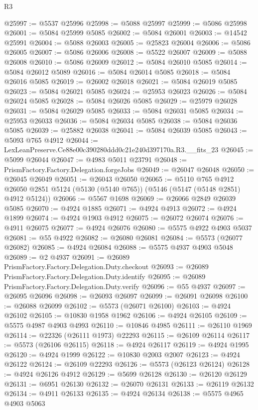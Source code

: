 \begin{lexlean}{R3}
\begin{coremodule}
@25997 := @5537 @25996
@25998 := @5088 @25997
@25999 := @5086 @25998
@26001 := @5084 @25999 @5085
@26002 := @5084 @26001
@26003 := @14542 @25991
@26004 := @5088 @26003
@26005 := @25823 @26004
@26006 := @5086 @26005
@26007 := @5086 @26006
@26008 := @5522 @26007
@26009 := @5088 @26008
@26010 := @5086 @26009
@26012 := @5084 @26010 @5085
@26014 := @5084 @26012 @5089
@26016 := @5084 @26014 @5085
@26018 := @5084 @26016 @5085
@26019 := @26002 @26018
@26021 := @5084 @26019 @5085
@26023 := @5084 @26021 @5085
@26024 := @25953 @26023
@26026 := @5084 @26024 @5085
@26028 := @5084 @26026 @5085
@26029 := @25979 @26028
@26031 := @5084 @26029 @5085
@26033 := @5084 @26031 @5085
@26034 := @25953 @26033
@26036 := @5084 @26034 @5085
@26038 := @5084 @26036 @5085
@26039 := @25882 @26038
@26041 := @5084 @26039 @5085
@26043 := @5093 @765 @4912
@26044 := LexLeanPreserve.Ce88e00c390280ddd0c21e240d397170a.R3.__fits_23
@26045 := @5099 @26044
@26047 := @4983 @5011 @23791
@26048 := PrismFactory.Factory.Delegation.forgeJobs
@26049 := @26047 @26048
@26050 := @26045 @26049
@26051 := @26043 @26050
@26065 := @5110
    @765
    @4912
    @26050
    @2851
    @5124
    (@5130 (@5140 @765))
    (@5146 (@5147 (@5148 @2851) @4912 @5124))
@26066 := @5567 @1698
@26069 := @26066 @2849 @26039 @5085
@26070 := @4924 @1885
@26071 := @4924 @4913
@26072 := @4924 @1899
@26074 := @4924 @1903 @4912
@26075 := @26072 @26074
@26076 := @4911 @26075
@26077 := @4924 @26076
@26080 := @5575 @4922 @4903 @5037
@26081 := @55 @4922
@26082 := @26080 @26081
@26084 := @5573 (@26077 @26082)
@26085 := @4924 @26084
@26088 := @5575 @4937 @4903 @5048
@26089 := @2 @4937
@26091 := @26089 PrismFactory.Factory.Delegation.Duty.checkout
@26093 := @26089 PrismFactory.Factory.Delegation.Duty.identify
@26095 := @26089 PrismFactory.Factory.Delegation.Duty.verify
@26096 := @55 @4937
@26097 := @26095 @26096
@26098 := @26093 @26097
@26099 := @26091 @26098
@26100 := @26088 @26099
@26102 := @5573 (@26071 @26100)
@26103 := @4924 @26102
@26105 := @10830 @1958 @1962
@26106 := @4924 @26105
@26109 := @5575 @4987 @4903 @4993
@26110 := @10846 @4985
@26111 := @26110 @1969
@26114 := @22326 (@26111 @1973) @22293
@26115 := @26109 @26114
@26117 := @5573 (@26106 @26115)
@26118 := @4924 @26117
@26119 := @4924 @1995
@26120 := @4924 @1999
@26122 := @10830 @2003 @2007
@26123 := @4924 @26122
@26124 := @26109 @22293
@26126 := @5573 (@26123 @26124)
@26128 := @4924 @26126 @4912
@26129 := @5699 @26128
@26130 := @26120 @26129
@26131 := @6951 @26130
@26132 := @26070 @26131
@26133 := @26119 @26132
@26134 := @4911 @26133
@26135 := @4924 @26134
@26138 := @5575 @4965 @4903 @5063

\end{coremodule}
\end{lexlean}
